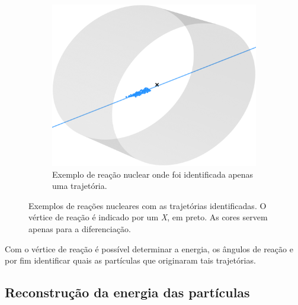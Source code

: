 \documentclass[a4paper,12pt,oneside]{book}
\begin{document}
\begin{figure}[H]
\begin{subfigure}[t]{0.45\textwidth}
        \label{subfig:res_exemplo_2_tracks}
    \end{subfigure}%
    \hspace{0.5cm}
    \begin{subfigure}[t]{0.45\textwidth}
        \centering
        \includegraphics[scale=0.4, width=.95\columnwidth]{figs/results_ex_1_track_num_220.png}
        \caption{Exemplo de reação nuclear onde foi identificada apenas uma trajetória.}
        \label{subfig:res_exemplo_1_track}
    \end{subfigure}
\caption{Exemplos de reações nucleares com as trajetórias identificadas. O vértice de reação é indicado por um \textit{X}, em preto. As cores servem apenas para a diferenciação.}
\label{fig:res_tracks}
\end{figure}


\par Com o vértice de reação é possível determinar a energia, os ângulos de reação e por fim identificar quais as partículas que originaram tais trajetórias.

\subsection{Reconstrução da energia das partículas}
\end{document}

